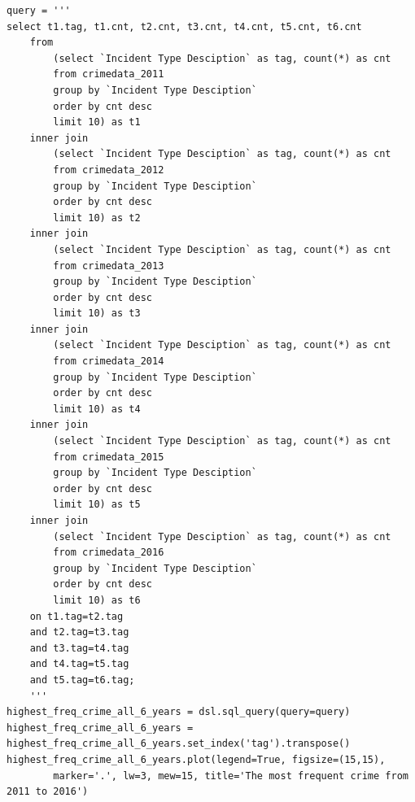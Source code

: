 \documentclass{article} %
\begin{document}
\label{appendix:plot1}
\lstset{language=python}
\lstset{frame=lines}
\lstset{showstringspaces=false}
\lstset{basicstyle=\footnotesize}
\begin{lstlisting}
query = '''
select t1.tag, t1.cnt, t2.cnt, t3.cnt, t4.cnt, t5.cnt, t6.cnt
	from
		(select `Incident Type Desciption` as tag, count(*) as cnt
		from crimedata_2011
		group by `Incident Type Desciption`
		order by cnt desc
		limit 10) as t1
	inner join
		(select `Incident Type Desciption` as tag, count(*) as cnt
		from crimedata_2012
		group by `Incident Type Desciption`
		order by cnt desc
		limit 10) as t2
	inner join 
		(select `Incident Type Desciption` as tag, count(*) as cnt
		from crimedata_2013
		group by `Incident Type Desciption`
		order by cnt desc
		limit 10) as t3
	inner join 
		(select `Incident Type Desciption` as tag, count(*) as cnt
		from crimedata_2014
		group by `Incident Type Desciption`
		order by cnt desc
		limit 10) as t4
	inner join 
		(select `Incident Type Desciption` as tag, count(*) as cnt
		from crimedata_2015
		group by `Incident Type Desciption`
		order by cnt desc
		limit 10) as t5
	inner join 
		(select `Incident Type Desciption` as tag, count(*) as cnt
		from crimedata_2016
		group by `Incident Type Desciption`
		order by cnt desc
		limit 10) as t6
	on t1.tag=t2.tag
	and t2.tag=t3.tag
	and t3.tag=t4.tag
	and t4.tag=t5.tag
	and t5.tag=t6.tag;
	'''
highest_freq_crime_all_6_years = dsl.sql_query(query=query)
highest_freq_crime_all_6_years = highest_freq_crime_all_6_years.set_index('tag').transpose()
highest_freq_crime_all_6_years.plot(legend=True, figsize=(15,15), 
		marker='.', lw=3, mew=15, title='The most frequent crime from 2011 to 2016')
\end{lstlisting}
\end{document}
